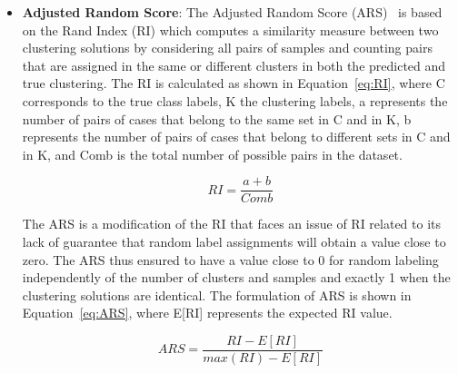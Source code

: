 \documentclass{article}
\begin{document}
\begin{itemize}
 \item \textbf{Adjusted Random Score}:
 The Adjusted Random Score (ARS)~\cite{steinleyPropertiesHubertArabieAdjusted2004} is based on the Rand Index (RI) which computes a similarity measure between two clustering solutions by considering all pairs of samples and counting pairs that are assigned in the same or different clusters in both the predicted and true clustering. The RI is calculated as shown in Equation~\autoref{eq:RI}, where C corresponds to the true class labels, K the clustering labels, a represents the number of pairs of cases that belong to the same set in C and in K, b represents the number of pairs of cases that belong to different sets in C and in K, and Comb is the total number of possible pairs in the dataset.
 
 \begin{equation}\label{eq:RI}
     RI = \frac{a+b}{Comb}
 \end{equation}
 
 
The ARS is a modification of the RI that faces an issue of RI related to its lack of guarantee that random label assignments will obtain a value close to zero. The ARS thus ensured to have a value close to 0 for random labeling independently of the number of clusters and samples and exactly 1 when the clustering solutions are identical. The formulation of ARS is shown in Equation~\autoref{eq:ARS}, where E[RI] represents the expected RI value.%
 
 \begin{equation}
  ARS ={\frac {RI-E[RI]}{max(RI)- E[RI]}}
  \label{eq:ARS}
\end{equation}
 

\end{itemize}
\end{document}
